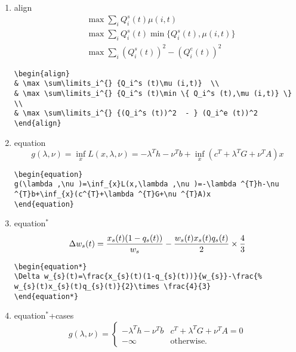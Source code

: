 \begin{enumerate}
\item align
\begin{align}
& \max \sum\limits_i^{} {Q_i^s (t)\mu (i,t)}  \\
& \max \sum\limits_i^{} {Q_i^s (t)\min \{ Q_i^s (t),\mu (i,t)} \}  \\
& \max \sum\limits_i^{} {(Q_i^s (t))^2  - } (Q_i^e (t))^2
\end{align}

\begin{lstlisting}[language=Tex]
\begin{align}
& \max \sum\limits_i^{} {Q_i^s (t)\mu (i,t)}  \\
& \max \sum\limits_i^{} {Q_i^s (t)\min \{ Q_i^s (t),\mu (i,t)} \}  \\
& \max \sum\limits_i^{} {(Q_i^s (t))^2  - } (Q_i^e (t))^2
\end{align}
\end{lstlisting}

\item equation
\begin{equation}
g(\lambda ,\nu )=\inf_{x}L(x,\lambda ,\nu )=-\lambda ^{T}h-\nu
^{T}b+\inf_{x}(c^{T}+\lambda ^{T}G+\nu ^{T}A)x
\end{equation}

\begin{lstlisting}[language=Tex]
\begin{equation}
g(\lambda ,\nu )=\inf_{x}L(x,\lambda ,\nu )=-\lambda ^{T}h-\nu
^{T}b+\inf_{x}(c^{T}+\lambda ^{T}G+\nu ^{T}A)x
\end{equation}
\end{lstlisting}

\item equation$^{\ast}$
\begin{equation*}
\Delta w_{s}(t)=\frac{x_{s}(t)(1-q_{s}(t))}{w_{s}}-\frac{%
w_{s}(t)x_{s}(t)q_{s}(t)}{2}\times \frac{4}{3}
\end{equation*}

\begin{lstlisting}[language=Tex]
\begin{equation*}
\Delta w_{s}(t)=\frac{x_{s}(t)(1-q_{s}(t))}{w_{s}}-\frac{%
w_{s}(t)x_{s}(t)q_{s}(t)}{2}\times \frac{4}{3}
\end{equation*}
\end{lstlisting}

\item equation$^{\ast}$+cases
\begin{equation*}
g(\lambda ,\nu )=
\begin{cases} -\lambda ^{T}h-\nu ^{T}b & c^{T}+\lambda ^{T}G+\nu ^{T}A=0
\\
-\infty &\text{otherwise.}
\end{cases}
\end{equation*}


\end{enumerate}
